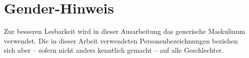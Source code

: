 \vspace*{3cm} %
\section*{Gender-Hinweis} %
Zur besseren Lesbarkeit wird in dieser Ausarbeitung das generische Maskulinum verwendet.
Die in dieser Arbeit verwendeten Personenbezeichnungen beziehen sich aber – sofern nicht anders kenntlich gemacht – auf
alle Geschlechter.
\clearpage